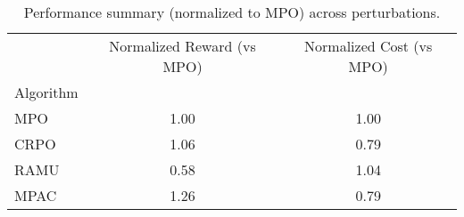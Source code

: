 \begin{table}
\caption{Performance summary (normalized to MPO) across perturbations.}
\label{tab:perf_norm_mpo}
\begin{tabular}{lcc}
\toprule
 & Normalized Reward (vs MPO) & Normalized Cost (vs MPO) \\
Algorithm &  &  \\
\midrule
MPO & 1.00 & 1.00 \\
CRPO & 1.06 & 0.79 \\
RAMU & 0.58 & 1.04 \\
MPAC & 1.26 & 0.79 \\
\bottomrule
\end{tabular}
\end{table}
